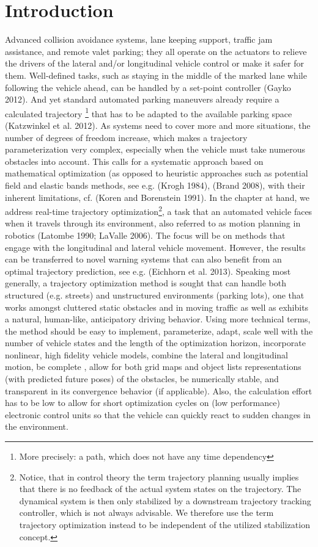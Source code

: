 \section{Introduction}\label{S:Intro}

Advanced collision avoidance systems, lane keeping support, traffic jam assistance, and remote valet parking; they all operate on the actuators to relieve the drivers of the lateral and/or longitudinal vehicle control or make it safer for them. Well-defined tasks, such as staying in the middle of the marked lane while following the vehicle ahead, can be handled by a set-point controller (Gayko 2012). And yet standard automated parking maneuvers already require a calculated trajectory \footnote{More precisely: a path, which does not have any time dependency} that has to be adapted to the available parking space (Katzwinkel et al. 2012). As systems need to cover more and more situations, the number of degrees of freedom increase, which makes a trajectory parameterization very complex, especially when the vehicle must take numerous obstacles into account. This calls for a systematic approach based on mathematical optimization (as opposed to heuristic approaches such as potential field and elastic bands methods, see e.g. (Krogh 1984), (Brand 2008), with their inherent limitations, cf. (Koren and Borenstein 1991).
In the chapter at hand, we address real-time trajectory optimization\footnote{Notice, that in control theory the term trajectory planning usually implies that there is no feedback of the actual system states on the trajectory. The dynamical system is then only stabilized by a downstream trajectory tracking controller, which is not always advisable. We therefore use the term trajectory optimization instead to be independent of the utilized stabilization concept.}, a task that an automated vehicle faces when it travels through its environment, also referred to as motion planning in robotics (Latombe 1990; LaValle 2006). The focus will be on methods that engage with the longitudinal and lateral vehicle movement. However, the results can be transferred to novel warning systems that can also 
benefit from an optimal trajectory prediction, see e.g. (Eichhorn et al. 2013). 
Speaking most generally, a trajectory optimization method is sought that can handle both structured (e.g. streets) and unstructured environments (parking lots), one that works amongst cluttered static obstacles and in moving traffic as well as exhibits a natural, human-like, anticipatory driving behavior.
Using more technical terms, the method should be easy to implement, parameterize, adapt, scale well with the number of vehicle states and the length of the optimization horizon, incorporate nonlinear, high fidelity vehicle models, combine the lateral and longitudinal motion, be complete , allow for both grid maps and object lists representations (with predicted future poses) of the obstacles, be numerically stable, and transparent in its convergence behavior (if applicable). Also, the calculation effort has to be low to allow for short optimization cycles on (low performance) electronic control units so that the vehicle can quickly react to sudden changes in the environment.
